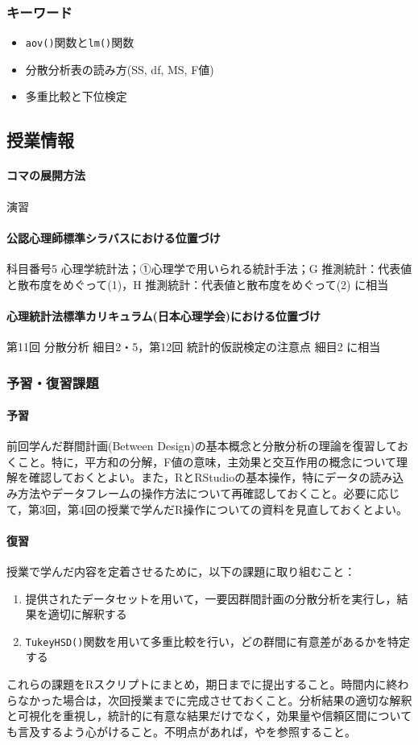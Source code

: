 \subsubsection{キーワード}
\begin{itemize}
	\item \verb|aov()|関数と\verb|lm()|関数
	\item 分散分析表の読み方(SS, df, MS, F値)
	\item 多重比較と下位検定
\end{itemize}
\subsection{授業情報}
\paragraph{コマの展開方法}
演習
\paragraph{公認心理師標準シラバスにおける位置づけ}
科目番号5 心理学統計法；①心理学で用いられる統計手法；G 推測統計：代表値と散布度をめぐって(1)，H 推測統計：代表値と散布度をめぐって(2) に相当
\paragraph{心理統計法標準カリキュラム(日本心理学会)における位置づけ}
第11回 分散分析 細目2・5，第12回 統計的仮説検定の注意点 細目2 に相当
\subsubsection{予習・復習課題}
\paragraph{予習}
前回学んだ群間計画(Between Design)の基本概念と分散分析の理論を復習しておくこと。特に，平方和の分解，F値の意味，主効果と交互作用の概念について理解を確認しておくとよい。また，RとRStudioの基本操作，特にデータの読み込み方法やデータフレームの操作方法について再確認しておくこと。必要に応じて，第3回，第4回の授業で学んだR操作についての資料を見直しておくとよい。

\paragraph{復習}
授業で学んだ内容を定着させるために，以下の課題に取り組むこと：

\begin{enumerate}
\item 提供されたデータセットを用いて，一要因群間計画の分散分析を実行し，結果を適切に解釈する
\item \verb|TukeyHSD()|関数を用いて多重比較を行い，どの群間に有意差があるかを特定する
\end{enumerate}

これらの課題をRスクリプトにまとめ，期日までに提出すること。時間内に終わらなかった場合は，次回授業までに完成させておくこと。分析結果の適切な解釈と可視化を重視し，統計的に有意な結果だけでなく，効果量や信頼区間についても言及するよう心がけること。不明点があれば，\textcite{kosugi2019}や\textcite{Hashimoto201607}を参照すること。